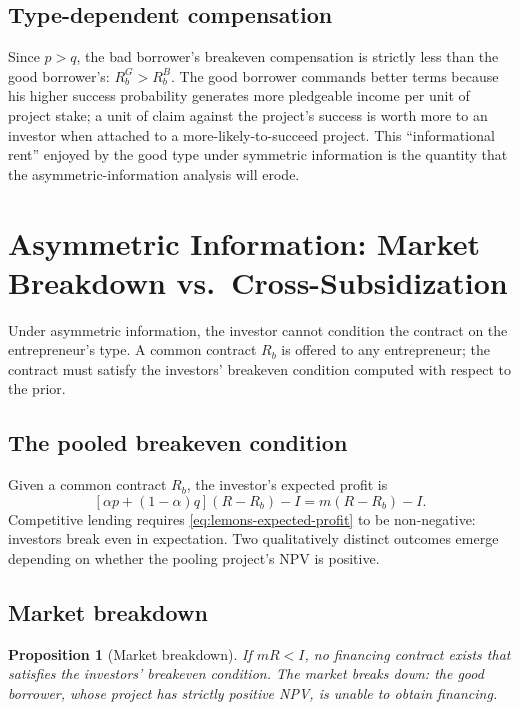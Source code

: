 \documentclass[11pt,a4paper,oneside]{book}
\theoremstyle{plain}
\newtheorem{proposition}[theorem]{Proposition}
\theoremstyle{definition}
\theoremstyle{remark}
\numberwithin{equation}{chapter}
\begin{document}
\subsection{Type-dependent compensation}

Since $p > q$, the bad borrower's breakeven compensation is strictly less than the good borrower's: $R_b^{G} > R_b^{B}$.
The good borrower commands better terms because his higher success probability generates more pledgeable income per unit of project stake; a unit of claim against the project's success is worth more to an investor when attached to a more-likely-to-succeed project.
This ``informational rent'' enjoyed by the good type under symmetric information is the quantity that the asymmetric-information analysis will erode.

\section{Asymmetric Information: Market Breakdown vs.\ Cross-Subsidization}
\label{sec:lemons-asymmetric}

Under asymmetric information, the investor cannot condition the contract on the entrepreneur's type.
A common contract $R_b$ is offered to any entrepreneur; the contract must satisfy the investors' breakeven condition computed with respect to the prior.

\subsection{The pooled breakeven condition}

Given a common contract $R_b$, the investor's expected profit is
\begin{equation}\label{eq:lemons-expected-profit}
  [\alpha p + (1 - \alpha) q](R - R_b) - I = m(R - R_b) - I.
\end{equation}
Competitive lending requires \eqref{eq:lemons-expected-profit} to be non-negative: investors break even in expectation.
Two qualitatively distinct outcomes emerge depending on whether the pooling project's NPV is positive.

\subsection{Market breakdown}

\begin{proposition}[Market breakdown]\label{prop:lemons-breakdown}
If $mR < I$, no financing contract exists that satisfies the investors' breakeven condition.
The market breaks down: the good borrower, whose project has strictly positive NPV, is unable to obtain financing.
\end{proposition}
\end{document}
